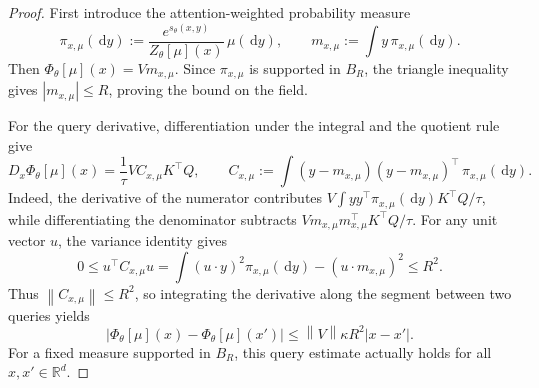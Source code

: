 \documentclass[11pt]{amsart}
\numberwithin{equation}{section}
\theoremstyle{plain}
\newcommand{\R}{\mathbb{R}}
\newcommand{\dd}{\,\mathrm{d}}
\newcommand{\abs}[1]{\left\lvert#1\right\rvert}
\newcommand{\norm}[1]{\left\lVert#1\right\rVert}
\begin{document}
\begin{proof}
First introduce the attention-weighted probability measure
\[
 \pi_{x,\mu}(\dd y)
 :=\frac{e^{s_\theta(x,y)}}{Z_\theta[\mu](x)}\,\mu(\dd y),
 \qquad
 m_{x,\mu}:=\int y\,\pi_{x,\mu}(\dd y).
\]
Then $\Phi_\theta[\mu](x)=Vm_{x,\mu}$.  Since $\pi_{x,\mu}$ is supported
in $B_R$, the triangle inequality gives $\abs{m_{x,\mu}}\leq R$, proving
the bound on the field.

For the query derivative, differentiation under the integral and the
quotient rule give
\begin{equation}\label{eq:attention-query-covariance}
 D_x\Phi_\theta[\mu](x)
 =\frac1\tau V C_{x,\mu}K^\top Q,\qquad
 C_{x,\mu}:=\int (y-m_{x,\mu})(y-m_{x,\mu})^\top
                         \,\pi_{x,\mu}(\dd y).
\end{equation}
Indeed, the derivative of the numerator contributes
$V\int yy^\top\pi_{x,\mu}(\dd y)K^\top Q/\tau$, while differentiating
the denominator subtracts $Vm_{x,\mu}m_{x,\mu}^\top K^\top Q/\tau$.
For any unit vector $u$, the variance identity gives
\[
 0\leq u^\top C_{x,\mu}u
 =\int (u\cdot y)^2\pi_{x,\mu}(\dd y)-(u\cdot m_{x,\mu})^2
 \leq R^2.
\]
Thus $\norm{C_{x,\mu}}\leq R^2$, so integrating the derivative along the
segment between two queries yields
\begin{equation}\label{eq:attention-state-lip}
 \abs{\Phi_\theta[\mu](x)-\Phi_\theta[\mu](x')}
 \leq\norm V\kappa R^2\abs{x-x'}.
\end{equation}
For a fixed measure supported in $B_R$, this query estimate actually holds
for all $x,x'\in\R^d$.


\end{proof}
\end{document}
